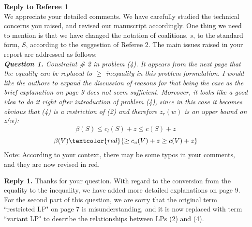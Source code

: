 \documentclass[11pt]{article}
\begin{document}
\noindent \textbf{\large Reply to Referee 1}
\\[3mm]
We appreciate your detailed comments.
We have carefully studied the technical concerns you raised, and revised our manuscript accordingly.
One thing we need to mention is that we have changed the notation of coalitions, $s$, to the standard form, $S$, according to the suggestion of  Referee 2.
The main issues raised in your report are addressed as follows:
\\[4mm]
%
%
\noindent \textit{\textbf{Question 1.}
Constraint \# 2 in problem (4). It appears from the next page that the equality can be replaced to $\geq$ inequality in this problem formulation. I would like the authors to expand the discussion of reasons for that being the case as the brief explanation on page 9 does not seem sufficient. Moreover, it looks like a good idea to do it right after introduction of problem (4), since in this case it becomes obvious that (4) is a restriction of (2) and therefore $z_r(w)$ is an upper bound on z(w):}
$$\beta(S) \leq c_l(S) + z \leq c(S) + z$$
$$\beta(V) \textcolor{red}{\geq c_u(V) + z \geq c(V) + z}$$
{\small Note: According to your context, there may be some typos in your comments, and they are now revised in red.}

\noindent \textbf{Reply 1.}
Thanks for your question. With regard to the conversion from the equality to the inequality, we have added more detailed explanations on page 9. For the second part of this question, we are sorry that the original term ``restricted LP" on page 7 is misunderstanding, and it is now replaced with term ``variant LP" to describe the relationships between LPs (2) and (4).
\end{document}

